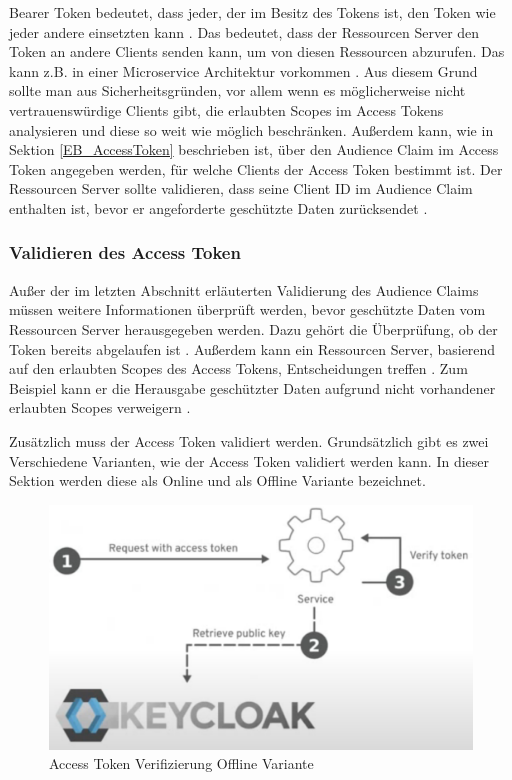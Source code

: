Bearer Token bedeutet, dass jeder, der im Besitz des Tokens ist, den Token wie jeder andere einsetzten kann \cite{EB29}. Das bedeutet, dass der Ressourcen Server den Token an andere Clients senden kann, um von diesen Ressourcen abzurufen. Das kann z.B. in einer Microservice Architektur vorkommen \cite{EB31}. Aus diesem Grund sollte man aus Sicherheitsgründen, vor allem wenn es möglicherweise nicht vertrauenswürdige Clients gibt, die erlaubten Scopes im Access Tokens analysieren und diese so weit wie möglich beschränken. Außerdem kann, wie in Sektion \ref{EB_AccessToken} beschrieben ist, über den Audience Claim im Access Token angegeben werden, für welche Clients der Access Token bestimmt ist. Der Ressourcen Server sollte validieren, dass seine Client ID im Audience Claim enthalten ist, bevor er angeforderte geschützte Daten zurücksendet \cite{EB30}.

\subsubsection{Validieren des Access Token} \label{Validieren des Access Token}

Außer der im letzten Abschnitt erläuterten Validierung des Audience Claims müssen weitere Informationen überprüft werden, bevor geschützte Daten vom Ressourcen Server herausgegeben werden. Dazu gehört die Überprüfung, ob der Token bereits abgelaufen ist \cite{EB60}. Außerdem kann ein Ressourcen Server, basierend auf den erlaubten Scopes des Access Tokens, Entscheidungen treffen \cite{EB66}. Zum Beispiel kann er die Herausgabe geschützter Daten aufgrund nicht vorhandener erlaubten Scopes verweigern \cite{EB66}.

Zusätzlich muss der Access Token validiert werden. Grundsätzlich gibt es zwei Verschiedene Varianten, wie der Access Token validiert werden kann. In dieser Sektion werden diese als Online und als Offline Variante bezeichnet.

\begin{figure}[!ht]
	\centering
	\includegraphics[width=.8\textwidth]{Images/Ebert/VerifyAccessTokenOffline.PNG}
	\caption{Access Token Verifizierung Offline Variante \cite{EB32}}
	\label{fig:EB_Access Token Verifizierung Offline Variante}
\end{figure}

